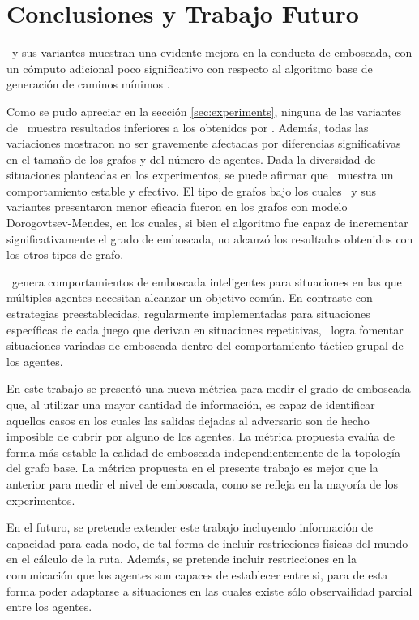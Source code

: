 \section{Conclusiones y Trabajo Futuro}
\label{sec:conclusions}

\ambush\ y sus variantes muestran una evidente mejora en la conducta de
emboscada, con un c\'omputo adicional poco significativo con respecto
al algoritmo base de generaci\'on de caminos m\'inimos \astar.

Como se pudo apreciar en la secci\'on \ref{sec:experiments}, ninguna
de las variantes de \ambush\ muestra resultados inferiores a los obtenidos
por \astar. Adem\'as, todas las variaciones mostraron no ser gravemente
afectadas por diferencias significativas en el tamaño de los grafos y
del n\'umero de agentes. Dada la diversidad de situaciones planteadas
en los experimentos, se puede afirmar que \ambush\ muestra un comportamiento
estable y efectivo. El tipo de grafos bajo los cuales \ambush\ y sus
variantes presentaron menor eficacia fueron en los grafos con modelo
Dorogovtsev-Mendes, en los cuales, si bien el algoritmo fue capaz de
incrementar significativamente el grado de emboscada, no alcanz\'o
los resultados obtenidos con los otros tipos de grafo.

\ambush\ genera comportamientos de emboscada inteligentes para situaciones
en las que múltiples agentes necesitan alcanzar un objetivo común. En
contraste con estrategias preestablecidas, regularmente implementadas para
situaciones específicas de cada juego que derivan en situaciones repetitivas,
\ambush\ logra fomentar situaciones va\-ria\-das de emboscada dentro del 
comportamiento táctico grupal de los agentes.

En este trabajo se present\'o una nueva m\'etrica para medir el grado de
emboscada que, al utilizar una mayor cantidad de informaci\'on, es capaz
de identificar aquellos casos en los cuales las salidas dejadas al
adversario son de hecho imposible de cubrir por alguno de los agentes.
La m\'etrica propuesta eval\'ua de forma m\'as estable la ca\-li\-dad de
emboscada independientemente de la topolog\'ia del grafo base.
La métrica propuesta en el presente trabajo es mejor que la anterior
para medir el nivel de emboscada, como se refleja en la mayoría de
los experimentos.

En el futuro, se pretende extender este trabajo incluyendo informaci\'on
de capacidad para cada nodo, de tal forma de incluir restricciones
f\'isicas del mundo en el c\'alculo de la ruta. Adem\'as, se pretende
incluir restricciones en la comunicaci\'on que los agentes son capaces
de establecer entre si, para de esta forma poder adaptarse a situaciones
en las cuales existe s\'olo observailidad parcial entre los agentes.
